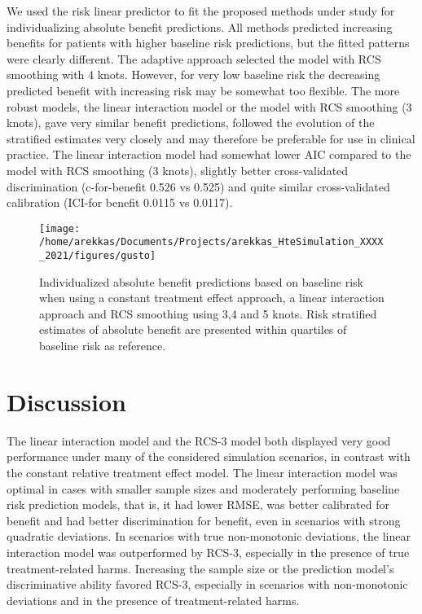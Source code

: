\documentclass[]{elsarticle} %
\begin{document}
We used the risk linear predictor to fit the proposed methods under
study for individualizing absolute benefit predictions. All methods
predicted increasing benefits for patients with higher baseline risk
predictions, but the fitted patterns were clearly different. The
adaptive approach selected the model with RCS smoothing with 4 knots.
However, for very low baseline risk the decreasing predicted benefit
with increasing risk may be somewhat too flexible. The more robust
models, the linear interaction model or the model with RCS smoothing (3
knots), gave very similar benefit predictions, followed the evolution of
the stratified estimates very closely and may therefore be preferable
for use in clinical practice. The linear interaction model had somewhat
lower AIC compared to the model with RCS smoothing (3 knots), slightly
better cross-validated discrimination (c-for-benefit 0.526 vs 0.525) and
quite similar cross-validated calibration (ICI-for benefit 0.0115 vs
0.0117).

\begin{figure}
\texttt{[image: /home/arekkas/Documents/Projects/arekkas\_HteSimulation\_XXXX\_2021/figures/gusto]} \caption{Individualized absolute benefit predictions based on baseline risk when using a constant treatment effect approach, a linear interaction approach and RCS smoothing using 3,4 and 5 knots. Risk stratified estimates of absolute benefit are presented within quartiles of baseline risk as reference.}\label{fig:gusto}
\end{figure}

\hypertarget{discussion}{%
\section{Discussion}\label{discussion}}

The linear interaction model and the RCS-3 model both displayed very
good performance under many of the considered simulation scenarios, in
contrast with the constant relative treatment effect model. The linear
interaction model was optimal in cases with smaller sample sizes and
moderately performing baseline risk prediction models, that is, it had
lower RMSE, was better calibrated for benefit and had better
discrimination for benefit, even in scenarios with strong quadratic
deviations. In scenarios with true non-monotonic deviations, the linear
interaction model was outperformed by RCS-3, especially in the presence
of true treatment-related harms. Increasing the sample size or the
prediction model's discriminative ability favored RCS-3, especially in
scenarios with non-monotonic deviations and in the presence of
treatment-related harms.
\end{document}

